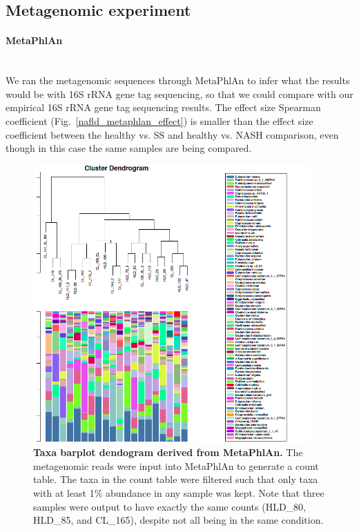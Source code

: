 \subsection{Metagenomic experiment}

\paragraph{MetaPhlAn}\mbox{}\\

We ran the metagenomic sequences through MetaPhlAn to infer what the results would be with 16S rRNA gene tag sequencing, so that we could compare with our empirical 16S rRNA gene tag sequencing results. The effect size Spearman coefficient (Fig.~\ref{nafld_metaphlan_effect}) is smaller than the effect size coefficient between the healthy vs. SS and healthy vs. NASH comparison, even though in this case the same samples are being compared.

\begin{figure}[h]
\begin{center}
\includegraphics[width=0.95\textwidth]{metaphlan_barplot_dendogram.png}
\caption{\textbf{Taxa barplot dendogram derived from MetaPhlAn.} The metagenomic reads were input into MetaPhlAn to generate a count table. The taxa in the count table were filtered such that only taxa with at least 1\% abundance in any sample was kept. Note that three samples were output to have exactly the same counts (HLD_80, HLD_85, and CL_165), despite not all being in the same condition.}
\end{center}
\label{nafld_metaphlan_barplot}
\end{figure}

